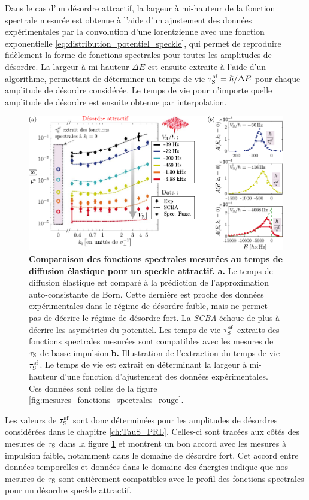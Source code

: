 Dans le cas d'un désordre attractif, la largeur à mi-hauteur de la fonction spectrale mesurée est obtenue à l'aide d'un ajustement des données expérimentales par la convolution d'une lorentzienne avec une fonction exponentielle \ref{eq:distribution_potentiel_speckle}, qui permet de reproduire fidèlement  la forme de fonctions spectrales pour toutes les amplitudes de désordre. La largeur à mi-hauteur $\Delta E$ est ensuite extraite à l'aide d'un algorithme, permettant de déterminer un temps de vie $\tau_{\mathrm{S}}^{\mathrm{sf}}=\hslash/\Delta E$ pour chaque amplitude de désordre considérée. Le temps de vie pour n'importe quelle amplitude de désordre est ensuite obtenue par interpolation.

\begin{figure}
\centering
\includegraphics[width=\textwidth]{Fig/TauS_NJP/comparaison_specfunc_taus_rouge.pdf}
\caption{\textbf{Comparaison des fonctions spectrales mesurées au temps de diffusion élastique pour un speckle attractif.} \textbf{a.} Le temps de diffusion élastique est comparé à la prédiction de l'approximation auto-consistante de Born. Cette dernière est proche des données expérimentales dans le régime de désordre faible, mais ne permet pas de décrire le régime de désordre fort. La \textit{SCBA} échoue de plus à décrire les asymétries du potentiel. Les temps de vie $\tau_{\mathrm{S}}^{\mathrm{sf}}$ extraits des fonctions spectrales mesurées sont compatibles avec les mesures de $\tau_{\mathrm{S}}$ de basse impulsion.\textbf{b.} Illustration de l'extraction du temps de vie $\tau_{\mathrm{S}}^{\mathrm{sf}}$. Le temps de vie est extrait en déterminant la largeur à mi-hauteur d'une fonction d'ajustement des données expérimentales. Ces données sont celles de la figure \ref{fig:mesures_fonctions_spectrales_rouge}.}
\label{fig:comparaison_taus_specfunc_rouge}
\end{figure}

Les valeurs de $\tau_{\mathrm{S}}^{\mathrm{sf}}$ sont donc déterminées pour les amplitudes de désordres considérées  dans le chapitre \ref{ch:TauS_PRL}. Celles-ci sont tracées aux côtés des mesures de $\tau_{\mathrm{S}}$ dans la figure \ref{fig:comparaison_taus_specfunc_rouge} et montrent un bon accord avec les mesures à impulsion faible, notamment dans le domaine de désordre fort. Cet accord entre données temporelles et données dans le domaine des énergies indique que nos mesures de $\tau_{\mathrm{S}}$ sont entièrement compatibles avec le profil des fonctions spectrales pour un désordre speckle attractif.





